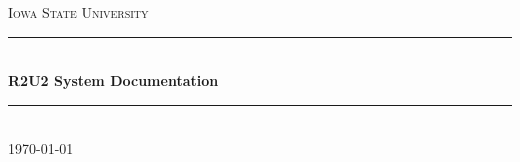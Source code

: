 \documentclass{article}
\theoremstyle{definition}
\begin{document}
\begin{titlepage}
	\newcommand{\HRule}{\rule{\linewidth}{0.5mm}}
	\center %
	\textsc{\LARGE Iowa State University}\\[1.5cm]
	\HRule\\[0.4cm]
	{\huge\bfseries R2U2 System Documentation}\\[0.4cm]
	\HRule\\[1.5cm]
	\vfill\vfill\vfill
	{\large\today}
	\vfill
\end{titlepage}


\tableofcontents
\clearpage


\clearpage


\clearpage


\clearpage


\clearpage


\clearpage


\clearpage
\end{document}
